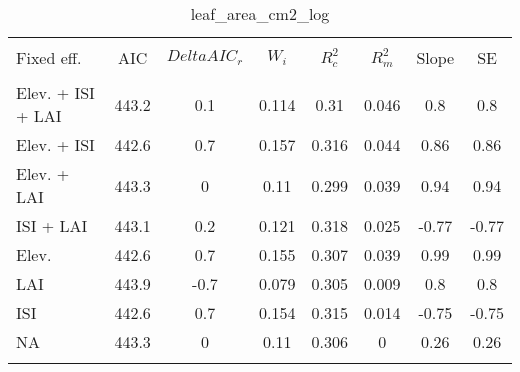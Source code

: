 
\begin{table}[!htbp] \centering 
  \caption{leaf_area_cm2_log} 
  \label{leaf_area_cm2_log} 
\begin{tabular}{@{\extracolsep{5pt}} lS[table-format=3.2]S[table-format=3.2]S[table-format=3.2]S[table-format=3.2]S[table-format=3.2]S[table-format=3.2]S[table-format=3.2]} 
\\[-1.8ex]\hline 
\hline \\[-1.8ex] 
{Fixed eff.} & {AIC} & {$Delta{}AIC_r$} & {$W_i$} & {$R^2_c$} & {$R^2_m$} & {Slope} & {SE} \\
\hline \\[-1.8ex] 
Elev. + ISI + LAI & 443.2 & 0.1 & 0.114 & 0.31 & 0.046 & 0.8 & 0.8 \\ 
Elev. + ISI & 442.6 & 0.7 & 0.157 & 0.316 & 0.044 & 0.86 & 0.86 \\ 
Elev. + LAI & 443.3 & 0 & 0.11 & 0.299 & 0.039 & 0.94 & 0.94 \\ 
ISI + LAI & 443.1 & 0.2 & 0.121 & 0.318 & 0.025 & -0.77 & -0.77 \\ 
Elev. & 442.6 & 0.7 & 0.155 & 0.307 & 0.039 & 0.99 & 0.99 \\ 
LAI & 443.9 & -0.7 & 0.079 & 0.305 & 0.009 & 0.8 & 0.8 \\ 
ISI & 442.6 & 0.7 & 0.154 & 0.315 & 0.014 & -0.75 & -0.75 \\ 
NA & 443.3 & 0 & 0.11 & 0.306 & 0 & 0.26 & 0.26 \\ 
\hline \\[-1.8ex] 
\end{tabular} 
\end{table} 
